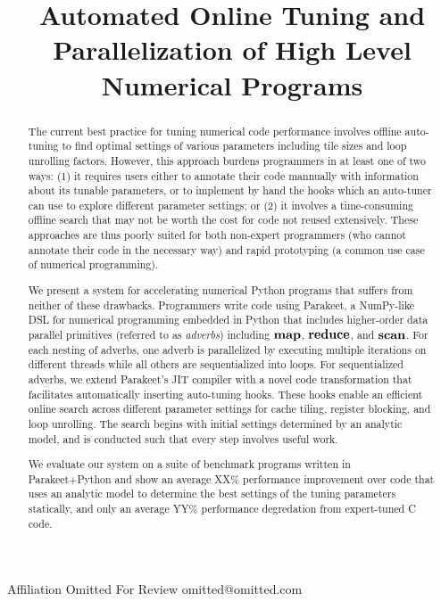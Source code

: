 \documentclass[preprint,9pt]{sigplanconf}
\begin{document}
\copyrightdata{[to be supplied]} 

\titlebanner{}        %

\title{Automated Online Tuning and Parallelization of High Level Numerical Programs}

           {Affiliation Omitted For Review}
           {omitted@omitted.com}

\newcommand{\MAP}{\impfnt{map}}
\newcommand{\REDUCE}{\impfnt{reduce}}
\newcommand{\SCAN}{\impfnt{scan}}
\newcommand{\ALLPAIRS}{\impfnt{allpairs}}
\newcommand{\concat}{\ensuremath{+\!\!\!\!+\,}}

\maketitle

\begin{abstract}
The current best practice for tuning numerical code performance involves offline auto-tuning to find optimal settings of various parameters including tile sizes and loop unrolling factors.  However, this approach burdens programmers in at least one of two ways: (1) it requires users either to annotate their code mannually with information about its tunable parameters, or to implement by hand the hooks which an auto-tuner can use to explore different parameter settings; or (2) it involves a time-consuming offline search that may not be worth the cost for code not reused extensively.  These approaches are thus poorly suited for both non-expert programmers (who cannot annotate their code in the necessary way) and rapid prototyping (a common use case of numerical programming).

We present a system for accelerating numerical Python programs that suffers from neither of these drawbacks. Programmers write code using Parakeet, a NumPy-like DSL for numerical programming embedded in Python that includes higher-order data parallel primitives (referred to as \emph{adverbs}) including $\MAP$, $\REDUCE$, and $\SCAN$.  For each nesting of adverbs, one adverb is parallelized by executing multiple iterations on different threads while all others are sequentialized into loops.  For sequentialized adverbs, we extend Parakeet's JIT compiler with a novel code transformation that facilitates automatically inserting auto-tuning hooks.  These hooks enable an efficient online search across different parameter settings for cache tiling, register blocking, and loop unrolling.  The search begins with initial settings determined by an analytic model, and is conducted such that every step involves useful work.

We evaluate our system on a suite of benchmark programs written in Parakeet+Python and show an average XX\% performance improvement over code that uses an analytic model to determine the best settings of the tuning parameters statically, and only an average YY\% performance degredation from expert-tuned C code.
\end{abstract}
\end{document}
